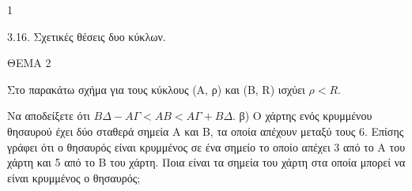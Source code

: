 \begin{ylh}{1}
    \item 3.16. Σχετικές θέσεις δυο κύκλων.
\end{ylh}

ΘΕΜΑ 2

\begin{alist}
\item Στο παρακάτω σχήμα για τους κύκλους (Α, ρ) και (Β, R) ισχύει $\rho < R$.



Να αποδείξετε ότι $Β\Delta - Α\Gamma < ΑΒ < Α\Gamma + Β\Delta$.  β) Ο χάρτης ενός κρυμμένου θησαυρού έχει δύο σταθερά σημεία Α και Β, τα οποία απέχουν μεταξύ τους 6. Επίσης γράφει ότι ο θησαυρός είναι κρυμμένος σε ένα σημείο το οποίο απέχει 3 από το Α του χάρτη και 5 από το Β του χάρτη. Ποια είναι τα σημεία του χάρτη στα οποία μπορεί να είναι κρυμμένος ο θησαυρός;

\end{alist}
